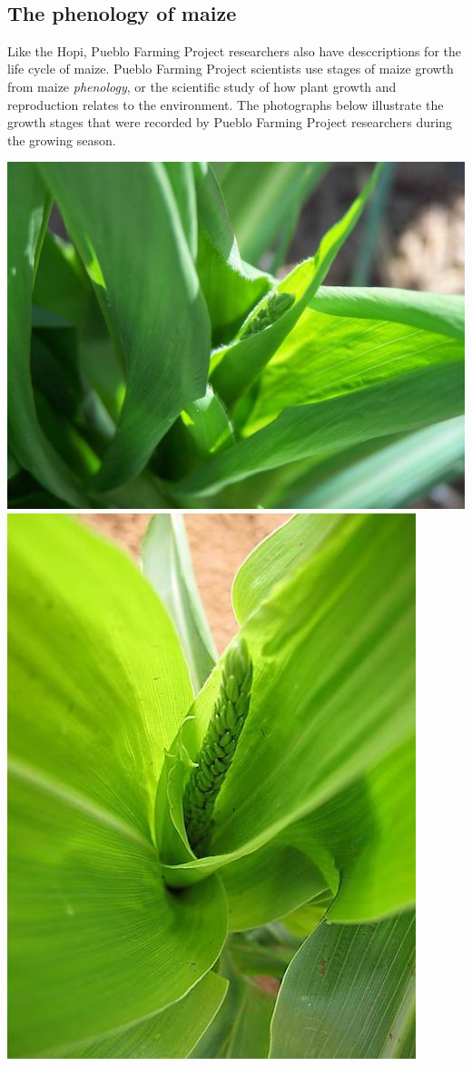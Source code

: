 \documentclass[12pt,]{article}
\begin{document}
~

\hypertarget{the-phenology-of-maize}{%
\subsection{The phenology of maize}\label{the-phenology-of-maize}}

Like the Hopi, Pueblo Farming Project researchers also have desccriptions for the life cycle of maize. Pueblo Farming Project scientists use stages of maize growth from maize \emph{phenology}, or the scientific study of how plant growth and reproduction relates to the environment. The photographs below illustrate the growth stages that were recorded by Pueblo Farming Project researchers during the growing season.

\includegraphics{./images/growth/1_early_tassel_development.jpg}
\includegraphics{./images/growth/2_early_tassel_development.jpg}
\end{document}
